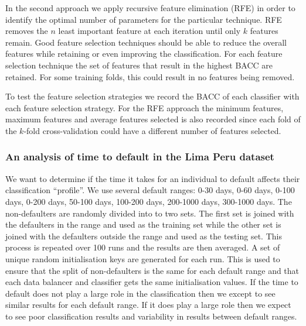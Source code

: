 \documentclass{sig-alternate-05-2015}
\begin{document}
	In the second approach we apply recursive feature elimination (RFE) in order to identify the optimal number of parameters for the particular technique. RFE removes the $n$ least important feature at each iteration until only $k$ features remain. Good feature selection techniques should be able to reduce the overall features while retaining or even improving the classification. For each feature selection technique the set of features that result in the highest BACC are retained. For some training folds, this could result in no features being removed. 
	
	To test the feature selection strategies we record the BACC of each classifier with each feature selection strategy. For the RFE approach the minimum features, maximum features and average features selected is also recorded since each fold of the $k$-fold cross-validation could have a different number of features selected.
	
	\subsubsection{An analysis of time to default in the Lima Peru dataset}
	We want to determine if the time it takes for an individual to default affects their classification ``profile''. We use several default ranges: 0-30 days, 0-60 days, 0-100 days, 0-200 days, 50-100 days, 100-200 days, 200-1000 days, 300-1000 days. The non-defaulters are randomly divided into to two sets. The first set is joined with the defaulters in the range and used as the training set while the other set is joined with the defaulters outside the range and used as the testing set. This process is repeated over 100 runs and the results are then averaged. A set of unique random initialisation keys are generated for each run. This is used to ensure that the split of non-defaulters is the same for each default range and that each data balancer and classifier gets the same initialisation values. If the time to default does not play a large role in the classification then we except to see similar results for each default range. If it does play a large role then we expect to see poor classification results and variability in results between default ranges.
	
\end{document}
